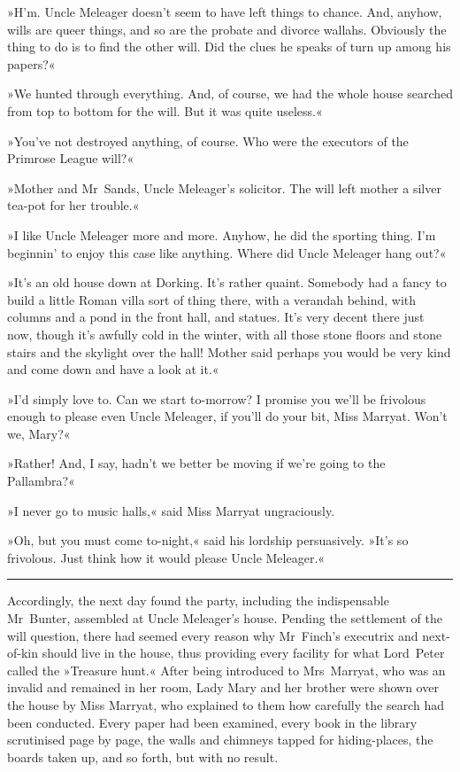 »H'm. Uncle Meleager doesn't seem to have left things to chance. And, anyhow, wills are queer things, and so are the probate and divorce wallahs. Obviously the thing to do is to find the other will. Did the clues he speaks of turn up among his papers?«

»We hunted through everything. And, of course, we had the whole house searched from top to bottom for the will. But it was quite useless.«

»You've not destroyed anything, of course. Who were the executors of the Primrose League will?«

»Mother and Mr~Sands, Uncle Meleager's solicitor. The will left mother a silver tea-pot for her trouble.«

»I like Uncle Meleager more and more. Anyhow, he did the sporting thing. I'm beginnin' to enjoy this case like anything. Where did Uncle Meleager hang out?«

»It's an old house down at Dorking. It's rather quaint. Somebody had a fancy to build a little Roman villa sort of thing there, with a verandah behind, with columns and a pond in the front hall, and statues. It's very decent there just now, though it's awfully cold in the winter, with all those stone floors and stone stairs and the skylight over the hall! Mother said perhaps you would be very kind and come down and have a look at it.«

»I'd simply love to. Can we start to-morrow? I promise you we'll be frivolous enough to please even Uncle Meleager, if you'll do your bit, Miss Marryat. Won't we, Mary?«

»Rather! And, I say, hadn't we better be moving if we're going to the Pallambra?«

»I never go to music halls,« said Miss Marryat ungraciously.

»Oh, but you must come to-night,« said his lordship persuasively. »It's so frivolous. Just think how it would please Uncle Meleager.«

\noindent\hfil\rule{0.5\textwidth}{.4pt}\hfil 

Accordingly, the next day found the party, including the indispensable Mr~Bunter, assembled at Uncle Meleager's house. Pending the settlement of the will question, there had seemed every reason why Mr~Finch's executrix and next-of-kin should live in the house, thus providing every facility for what Lord~Peter called the »Treasure hunt.« After being introduced to Mrs~Marryat, who was an invalid and remained in her room, Lady Mary and her brother were shown over the house by Miss Marryat, who explained to them how carefully the search had been conducted. Every paper had been examined, every book in the library scrutinised page by page, the walls and chimneys tapped for hiding-places, the boards taken up, and so forth, but with no result.

